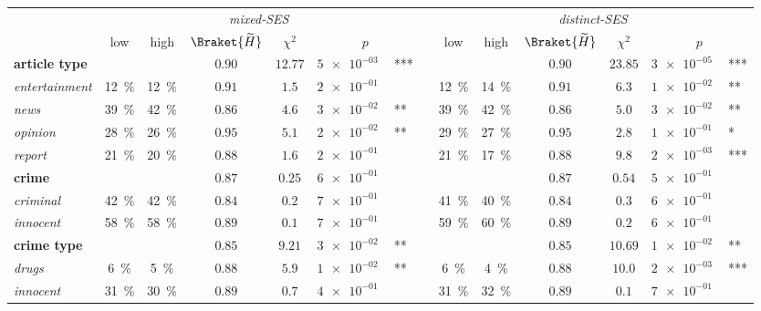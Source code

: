 \begin{tabular}{lccccr@{\hskip0pt}llccccr@{\hskip0pt}l}\toprule & \multicolumn{6}{c}{\textit{mixed-SES}} && \multicolumn{6}{c}{\textit{distinct-SES}} \\ & low & high & $\Braket{\widetilde{H}}$ & $\chi^2$ & \multicolumn{2}{c}{$p$} && low & high & $\Braket{\widetilde{H}}$ & $\chi^2$ & \multicolumn{2}{c}{$p$} \\\toprule
\textbf{article type} & & & $0.90$ & $12.77$ & $\SI{5e-03}{}$ & *** && & & $0.90$ & $23.85$ & $\SI{3e-05}{}$ & *** \\
\textit{entertainment} & \SI{12}{\percent} & \SI{12}{\percent} & $0.91$ & $1.5$ & $\SI{2e-01}{}$ &  && \SI{12}{\percent} & \SI{14}{\percent} & $0.91$ & $6.3$ & $\SI{1e-02}{}$ & ** \\
\textit{news} & \SI{39}{\percent} & \SI{42}{\percent} & $0.86$ & $4.6$ & $\SI{3e-02}{}$ & ** && \SI{39}{\percent} & \SI{42}{\percent} & $0.86$ & $5.0$ & $\SI{3e-02}{}$ & ** \\
\textit{opinion} & \SI{28}{\percent} & \SI{26}{\percent} & $0.95$ & $5.1$ & $\SI{2e-02}{}$ & ** && \SI{29}{\percent} & \SI{27}{\percent} & $0.95$ & $2.8$ & $\SI{1e-01}{}$ & * \\
\textit{report} & \SI{21}{\percent} & \SI{20}{\percent} & $0.88$ & $1.6$ & $\SI{2e-01}{}$ &  && \SI{21}{\percent} & \SI{17}{\percent} & $0.88$ & $9.8$ & $\SI{2e-03}{}$ & *** \\
\midrule\textbf{crime} & & & $0.87$ & $0.25$ & $\SI{6e-01}{}$ &  && & & $0.87$ & $0.54$ & $\SI{5e-01}{}$ &  \\
\textit{criminal} & \SI{42}{\percent} & \SI{42}{\percent} & $0.84$ & $0.2$ & $\SI{7e-01}{}$ &  && \SI{41}{\percent} & \SI{40}{\percent} & $0.84$ & $0.3$ & $\SI{6e-01}{}$ &  \\
\textit{innocent} & \SI{58}{\percent} & \SI{58}{\percent} & $0.89$ & $0.1$ & $\SI{7e-01}{}$ &  && \SI{59}{\percent} & \SI{60}{\percent} & $0.89$ & $0.2$ & $\SI{6e-01}{}$ &  \\
\midrule\textbf{crime type} & & & $0.85$ & $9.21$ & $\SI{3e-02}{}$ & ** && & & $0.85$ & $10.69$ & $\SI{1e-02}{}$ & ** \\
\textit{drugs} & \SI{6}{\percent} & \SI{5}{\percent} & $0.88$ & $5.9$ & $\SI{1e-02}{}$ & ** && \SI{6}{\percent} & \SI{4}{\percent} & $0.88$ & $10.0$ & $\SI{2e-03}{}$ & *** \\
\textit{innocent} & \SI{31}{\percent} & \SI{30}{\percent} & $0.89$ & $0.7$ & $\SI{4e-01}{}$ &  && \SI{31}{\percent} & \SI{32}{\percent} & $0.89$ & $0.1$ & $\SI{7e-01}{}$ &  \\

\end{tabular}
